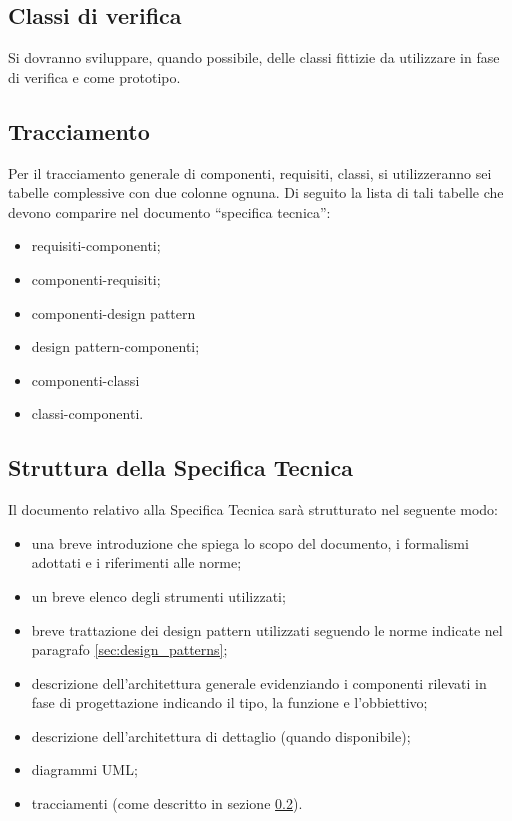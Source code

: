 {\subsection{Classi di verifica}
Si dovranno sviluppare, quando possibile, delle classi fittizie da utilizzare in fase di verifica e come prototipo.

\subsection{Tracciamento}
\label{sec:tracciamenti_progettazione}
Per il tracciamento generale di componenti, requisiti, classi, si utilizzeranno sei tabelle complessive con due colonne ognuna. Di seguito la lista di tali tabelle che devono comparire nel documento ``specifica tecnica'':
\begin{itemize}
\item requisiti-componenti;
\item componenti-requisiti;
\item componenti-design pattern
\item design pattern-componenti;
\item componenti-classi
\item classi-componenti.
\end{itemize} 
\subsection{Struttura della Specifica Tecnica}
Il documento relativo alla Specifica Tecnica sarà strutturato nel seguente modo:
\begin{itemize}
\item una breve introduzione che spiega lo scopo del documento, i formalismi adottati e i riferimenti alle norme;
\item un breve elenco degli strumenti utilizzati;
\item breve trattazione dei design pattern utilizzati seguendo le norme indicate nel paragrafo \ref{sec:design_patterns};
\item descrizione dell'architettura generale evidenziando i componenti rilevati in fase di progettazione indicando il tipo, la funzione e l'obbiettivo;
\item descrizione dell'architettura di dettaglio (quando disponibile);
\item diagrammi UML;
\item tracciamenti (come descritto in sezione \ref{sec:tracciamenti_progettazione}).
\end{itemize}

}

